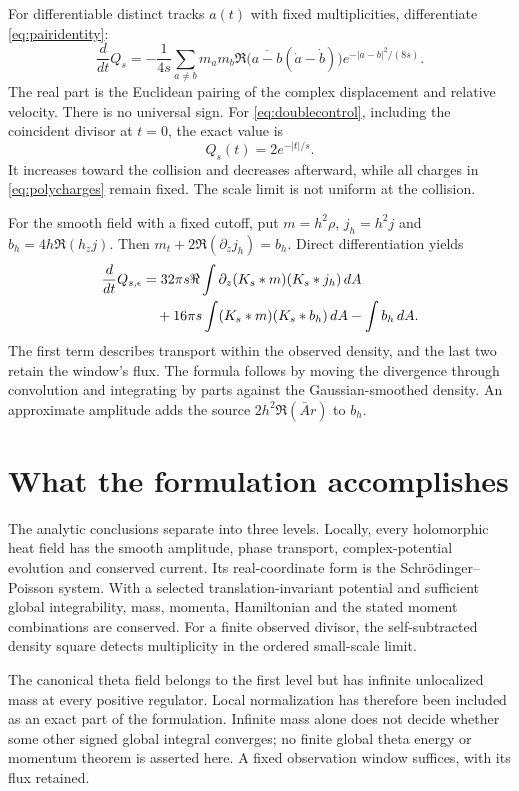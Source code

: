 \documentclass[11pt]{article}
\newcommand{\dd}{\,d}
\newcommand{\eps}{\epsilon}
\theoremstyle{definition}
\theoremstyle{remark}
\begin{document}
For differentiable distinct tracks $a(t)$ with fixed multiplicities,
differentiate \eqref{eq:pairidentity}:
\begin{equation}
 \frac d{dt}Q_s
 =-\frac1{4s}\sum_{a\ne b}m_am_b
 \Re\bigl(\overline{a-b}(\dot a-\dot b)\bigr)
 e^{-|a-b|^2/(8s)}.
 \label{eq:pairtime}
\end{equation}
The real part is the Euclidean pairing of the complex displacement
and relative velocity. There is no universal sign. For
\eqref{eq:doublecontrol}, including the coincident divisor
at $t=0$, the exact value is
\begin{equation}
 Q_s(t)=2e^{-|t|/s}. \label{eq:paircontrol}
\end{equation}
It increases toward the collision and decreases afterward, while all
charges in \eqref{eq:polycharges} remain fixed. The scale limit is not
uniform at the collision.

For the smooth field with a fixed cutoff, put
$m=h^2\rho$, $j_h=h^2j$ and $b_h=4h\Re(h_zj)$. Then
$m_t+2\Re(\partial_z j_h)=b_h$. Direct differentiation yields
\begin{align}
 \frac d{dt}Q_{s,\eps}
 &=32\pi s\Re\int
 \partial_z(K_s*m)(K_s*j_h)\dd A\notag\\
 &\quad+16\pi s\int(K_s*m)(K_s*b_h)\dd A-\int b_h\dd A.
 \label{eq:observabletransport}
\end{align}
The first term describes transport within the observed density, and
the last two retain the window's flux. The formula follows by moving
the divergence through convolution and integrating by parts against
the Gaussian-smoothed density. An approximate amplitude adds the
source $2h^2\Re(\bar A r)$ to $b_h$.

\section{What the formulation accomplishes}
\label{sec:scope}

The analytic conclusions separate into three levels. Locally, every
holomorphic heat field has the smooth amplitude, phase transport,
complex-potential evolution and conserved current. Its real-coordinate
form is the Schr\"odinger--Poisson system. With a selected
translation-invariant potential and sufficient global integrability,
mass, momenta, Hamiltonian and the stated moment combinations are
conserved. For a finite observed divisor, the self-subtracted density
square detects multiplicity in the ordered small-scale limit.

The canonical theta field belongs to the first level but has infinite
unlocalized mass at every positive regulator. Local normalization has
therefore been included as an exact part of the formulation. Infinite
mass alone does not decide whether some other signed global integral
converges; no finite global theta energy or momentum theorem is asserted
here. A fixed observation window suffices, with its flux retained.
\end{document}

